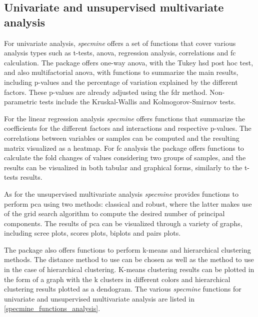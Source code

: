 \subsection{Univariate and unsupervised multivariate analysis}

For univariate analysis, \textit{specmine} offers a set of functions that cover various analysis types such as t-tests, \gls{anova}, regression analysis, correlations and \gls{fc} calculation. The package offers one-way \gls{anova}, with the Tukey \gls{hsd} post hoc test, and also multifactorial \gls{anova}, with functions to summarize the main results, including p-values and the percentage of variation explained by the different factors. These p-values are already adjusted using the \gls{fdr} method. Non-parametric tests include the Kruskal-Wallis and Kolmogorov-Smirnov tests. 

For the linear regression analysis \textit{specmine} offers functions that summarize the coefficients for the different factors and interactions and respective p-values. The correlations between variables or samples can be computed and the resulting matrix visualized as a heatmap. For \gls{fc} analysis the package offers functions to calculate the fold changes of values considering two groups of samples, and the results can be visualized in both tabular and graphical forms, similarly to the t-tests results.
 
As for the unsupervised multivariate analysis \textit{specmine} provides functions to perform \gls{pca} using two methods: classical and robust, where the latter makes use of the grid search algorithm to compute the desired number of principal components. The results of \gls{pca} can be visualized through a variety of graphs, including scree plots, scores plots, biplots and pairs plots. 

The package also offers functions to perform k-means and hierarchical clustering methods. The distance method to use can be chosen as well as the method to use in the case of hierarchical clustering. K-means clustering results can be plotted in the form of a graph with the k clusters in different colors and hierarchical clustering results plotted as a dendogram. The various \textit{specmine} functions for univariate and unsupervised multivariate analysis are listed in \autoref{specmine_functions_analysis}.



